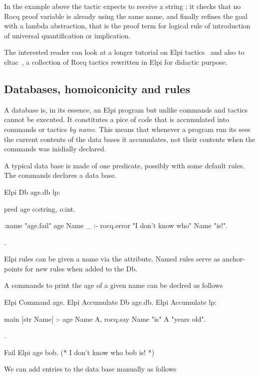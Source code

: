\documentclass[a4paper, 11pt]{book}
\begin{document}
In the example above the tactic expects to receive a string ;
it checks that no Rocq proof variable is already using the same name, and
finally refines the goal with a lambda abstraction, that is the proof term
for logical rule of introduction of universal quantification or implication.
  
The interested reader can look at a longer tutorial on Elpi tactics~\cite{tuto:tactics}
and also to eltac~\cite{app:eltac}, a collection of Rocq tactics rewritten in Elpi for
didactic purpose.

\subsection{Databases, homoiconicity and rules}\label{sec:homo}

A database is, in its essence, an Elpi program but unlike commands and
tactics cannot be executed. It constitutes a pice of code that is
accumulated into commands or tactics \emph{by name}. This means that
whenever a program run its sees the current contents of the data bases
it accumulates, not their contents when the commands was inidially declared.

A typical data base is made of one predicate, possibly with some default
rules. The  commands declares a data base.

\begin{rocqcode}
Elpi Db age.db lp:{{
  pred age o:string, o:int.

  :name "age.fail"
  age Name _ :- rocq.error "I don't know who" Name "is!".
}}.
\end{rocqcode}

Elpi rules can be given a name via the  attribute.
Named rules serve as anchor-points for new rules when added to the Db.

A commands to print the age of a given name can be declred as follows

\begin{rocqcode}
Elpi Command age.
Elpi Accumulate Db age.db.
Elpi Accumulate lp:{{

  main [str Name] :-
    age Name A,
    rocq.say Name "is" A "years old".

}}.

Fail Elpi age bob. (* I don't know who bob is! *)
\end{rocqcode}

We can add entries to the data base manually as follows
\end{document}
